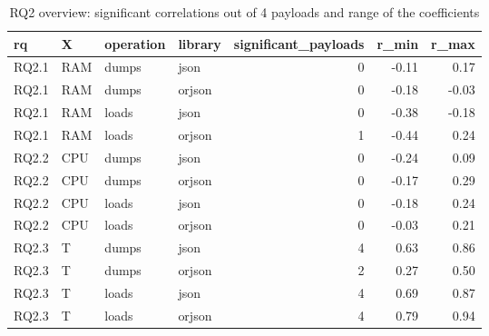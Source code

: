 \begin{table}[ht]
\centering
\begin{tabular}{llllrrr}
  \toprule
rq & X & operation & library & significant\_payloads & r\_min & r\_max \\ 
  \midrule
RQ2.1 & RAM & dumps & json &   0 & -0.11 & 0.17 \\ 
  RQ2.1 & RAM & dumps & orjson &   0 & -0.18 & -0.03 \\ 
  RQ2.1 & RAM & loads & json &   0 & -0.38 & -0.18 \\ 
  RQ2.1 & RAM & loads & orjson &   1 & -0.44 & 0.24 \\ 
  RQ2.2 & CPU & dumps & json &   0 & -0.24 & 0.09 \\ 
  RQ2.2 & CPU & dumps & orjson &   0 & -0.17 & 0.29 \\ 
  RQ2.2 & CPU & loads & json &   0 & -0.18 & 0.24 \\ 
  RQ2.2 & CPU & loads & orjson &   0 & -0.03 & 0.21 \\ 
  RQ2.3 & T & dumps & json &   4 & 0.63 & 0.86 \\ 
  RQ2.3 & T & dumps & orjson &   2 & 0.27 & 0.50 \\ 
  RQ2.3 & T & loads & json &   4 & 0.69 & 0.87 \\ 
  RQ2.3 & T & loads & orjson &   4 & 0.79 & 0.94 \\ 
   \bottomrule
\end{tabular}
\caption{RQ2 overview: significant correlations out of 4 payloads and range of the coefficients} 
\label{tab:rq2_summary}
\end{table}

